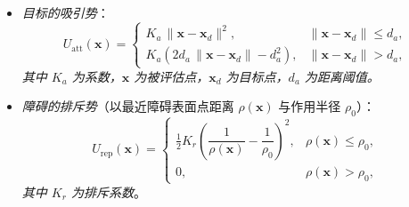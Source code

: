 \documentclass[../main.tex]{subfiles}
\begin{document}
\begin{enumerate}
\begin{itemize}
\begin{enumerate}
\begin{itemize}
                        \item \textit{目标的吸引势}：
                        \[
                        U_{\mathrm{att}}(\mathbf{x})=
                        \begin{cases}
                            K_a\,\lVert \mathbf{x}-\mathbf{x}_d\rVert^2, & \lVert \mathbf{x}-\mathbf{x}_d\rVert \le d_a,\\[4pt]
                            K_a\!\left(2d_a\,\lVert \mathbf{x}-\mathbf{x}_d\rVert - d_a^2\right), & \lVert \mathbf{x}-\mathbf{x}_d\rVert > d_a,
                        \end{cases}
                        \]
                        \textit{其中 \(K_a\) 为系数，\(\mathbf{x}\) 为被评估点，\(\mathbf{x}_d\) 为目标点，\(d_a\) 为距离阈值。}
                        \item \textit{障碍的排斥势}（以最近障碍表面点距离 \(\rho(\mathbf{x})\) 与作用半径 \(\rho_0\)）：
                        \[
                        U_{\mathrm{rep}}(\mathbf{x})=
                        \begin{cases}
                            \tfrac{1}{2}K_r\!\left(\dfrac{1}{\rho(\mathbf{x})}-\dfrac{1}{\rho_0}\right)^{\!2}, & \rho(\mathbf{x}) \le \rho_0,\\[8pt]
                            0, & \rho(\mathbf{x}) > \rho_0,
                        \end{cases}
                        \]
                        \textit{其中 \(K_r\) 为排斥系数}。
                    \end{itemize}
                

\end{enumerate}
\end{itemize}
\end{enumerate}
\end{document}
